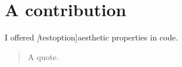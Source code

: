 

\section{A contribution}

I offered \emph[testoption]{aesthetic properties} in code.

\begin{quote}
    A quote.
\end{quote}

